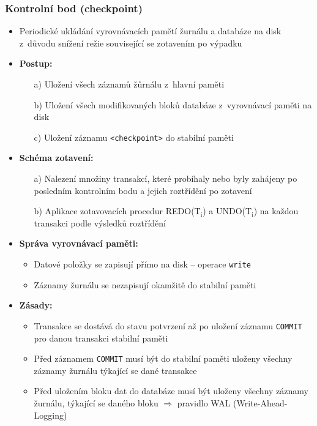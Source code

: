 \documentclass[a4paper,10pt]{article}
\newcommand{\pojem}[2]{\item \textbf{#1:}\quad #2}
\newcommand{\tedy}{$\Rightarrow$ }
\begin{document}
			\subsubsection{Kontrolní bod (checkpoint)}
				\begin{itemize}
					\item Periodické ukládání vyrovnávacích pamětí žurnálu a databáze na disk z~důvodu snížení režie související se zotavením po výpadku
					\pojem{Postup}
					\begin{itemize}
						\item[a)] Uložení všech záznamů žůrnálu z~hlavní paměti
						\item[b)] Uložení všech modifikovaných bloků databáze z~vyrovnávací paměti na disk
						\item[c)] Uložení záznamu \texttt{<checkpoint>} do stabilní paměti
					\end{itemize}
					\pojem{Schéma zotavení}
					\begin{itemize}
						\item[a)] Nalezení množiny transakcí, které probíhaly nebo byly zahájeny po posledním kontrolním bodu a jejich roztřídění po zotavení
						\item[b)] Aplikace zotavovacích procedur REDO(T$_\textrm{i}$) a UNDO(T$_\textrm{i}$) na každou transakci podle výsledků roztřídění
					\end{itemize}
					\begin{figure}[h!]
						\centering
					\end{figure}
										
					\pojem{Správa vyrovnávací paměti}
					\begin{itemize}
						\item Datové položky se zapisují přímo na disk -- operace \texttt{write}
						\item Záznamy žurnálu se nezapisují okamžitě do stabilní paměti
					\end{itemize}
					\pojem{Zásady}
					\begin{itemize}
						\item Transakce se dostává do stavu potvrzení až po uložení záznamu \texttt{COMMIT} pro danou transakci stabilní paměti
						\item Před záznamem \texttt{COMMIT} musí být do stabilní paměti uloženy všechny záznamy žurnálu týkající se dané transakce
						\item Před uložením bloku dat do databáze musí být uloženy všechny záznamy žurnálu, týkající se daného bloku \tedy pravidlo WAL (Write-Ahead-Logging)
					\end{itemize}
				\end{itemize}
				
\end{document}
